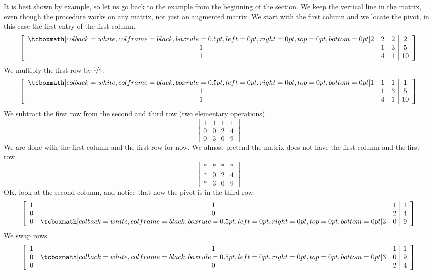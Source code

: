 It is best shown by example, so let us go back to the
example from the beginning of the section.
We keep the vertical line in the matrix,
even though the procedure works on any matrix, not just
an augmented matrix.
We start with the first column and we locate the pivot, in this
case the first entry of the first column.
\begin{equation*}
\left[
\begin{array}{ccc|c}
\mybxsm{2} & 2 & 2 & 2 \\
1 & 1 & 3 & 5 \\
1 & 4 & 1 & 10
\end{array}
\right]
\end{equation*}
We multiply the first row by
$\nicefrac{1}{2}$.
\begin{equation*}
\left[
\begin{array}{ccc|c}
\mybxsm{1} & 1 & 1 & 1 \\
1 & 1 & 3 & 5 \\
1 & 4 & 1 & 10
\end{array}
\right]
\end{equation*}
We subtract the first row from the second and third row (two elementary
operations).
\begin{equation*}
\left[
\begin{array}{ccc|c}
1 & 1 & 1 & 1 \\
0 & 0 & 2 & 4 \\
0 & 3 & 0 & 9
\end{array}
\right]
\end{equation*}
We are done with the first column and the first row for now.  We almost
pretend the matrix does not have the first column and the first row.
\begin{equation*}
\left[
\begin{array}{ccc|c}
* & * & * & * \\
* & 0 & 2 & 4 \\
* & 3 & 0 & 9
\end{array}
\right]
\end{equation*}
OK\@, look at the second column, and notice that now the pivot is in the
third row.
\begin{equation*}
\left[
\begin{array}{ccc|c}
1 & 1 & 1 & 1 \\
0 & 0 & 2 & 4 \\
0 & \mybxsm{3} & 0 & 9
\end{array}
\right]
\end{equation*}
We swap rows.
\begin{equation*}
\left[
\begin{array}{ccc|c}
1 & 1 & 1 & 1 \\
0 & \mybxsm{3} & 0 & 9 \\
0 & 0 & 2 & 4
\end{array}
\right]
\end{equation*}
